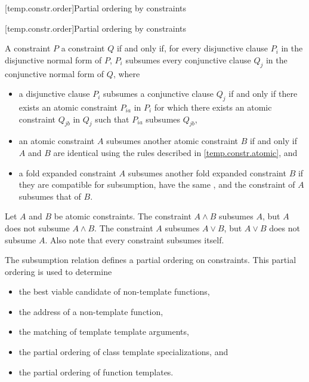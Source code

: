 \documentclass{wg21}
\begin{document}
[temp.constr.order]{Partial ordering by constraints}

[temp.constr.order]{Partial ordering by constraints}

\pnum
{}
A constraint $P$  a constraint $Q$
if and only if,
for every disjunctive clause $P_i$
in the disjunctive normal form of $P$, $P_i$ subsumes every conjunctive clause $Q_j$
in the conjunctive normal form of $Q$, where
\begin{itemize}
    \item
    a disjunctive clause $P_i$ subsumes a conjunctive clause $Q_j$ if and only
    if there exists an atomic constraint $P_{ia}$ in $P_i$ for which there exists
    an atomic constraint $Q_{jb}$ in $Q_j$ such that $P_{ia}$ subsumes $Q_{jb}$,

    \item an atomic constraint $A$ subsumes another atomic constraint
    $B$ if and only if $A$ and $B$ are identical using the
    rules described in \ref{temp.constr.atomic}, and

    \item a fold expanded constraint $A$ subsumes
    another fold expanded constraint $B$
    if they are compatible for subsumption,
    have the same , and
    the constraint of $A$ subsumes that of $B$.


\end{itemize}
%
\begin{example}
    Let $A$ and $B$ be atomic constraints.
    The constraint $A \land B$ subsumes $A$, but $A$ does not subsume $A \land B$.
    The constraint $A$ subsumes $A \lor B$, but $A \lor B$ does not subsume $A$.
    Also note that every constraint subsumes itself.
\end{example}

\pnum
\begin{note}
    The subsumption relation defines a partial ordering on constraints.
    This partial ordering is used to determine
    \begin{itemize}
        \item the best viable candidate of non-template functions,
        \item the address of a non-template function,
        \item the matching of template template arguments,
        \item the partial ordering of class template specializations, and
        \item the partial ordering of function templates.
    \end{itemize}
\end{note}
\end{document}
